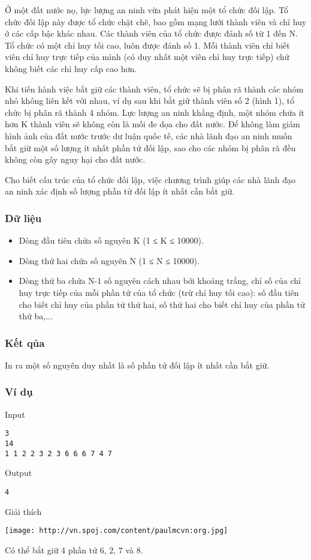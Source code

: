 

Ở một đất nước nọ, lực lượng an ninh vừa phát hiện một tổ chức đối lập. Tổ chức đối lập này được tổ chức chặt chẽ, bao gồm mạng lưới thành viên và chỉ huy ở các cấp bậc khác nhau. Các thành viên của tổ chức được đánh số từ 1 đến N. Tổ chức có một chỉ huy tối cao, luôn được đánh số 1. Mỗi thành viên chỉ biết viên chỉ huy trực tiếp của mình (có duy nhất một viên chỉ huy trực tiếp) chứ không biết các chỉ huy cấp cao hơn.

Khi tiến hành việc bắt giữ các thành viên, tổ chức sẽ bị phân rã thành các nhóm nhỏ không liên kết với nhau, ví dụ sau khi bắt giữ thành viên số 2 (hình 1), tổ chức bị phân rã thành 4 nhóm. Lực lượng an ninh khẳng định, một nhóm chứa ít hơn K thành viên sẽ không còn là mối đe dọa cho đất nước. Để không làm giảm hình ảnh của đất nước trước dư luận quốc tế, các nhà lãnh đạo an ninh muốn bắt giữ một số lượng ít nhất phần tử đối lập, sao cho các nhóm bị phân rã đều không còn gây nguy hại cho đất nước.

Cho biết cấu trúc của tổ chức đối lập, việc chương trình giúp các nhà lãnh đạo an ninh xác định số lượng phần tử đối lập ít nhất cần bắt giữ.

\subsubsection{Dữ liệu}
\begin{itemize}
	\item Dòng đầu tiên chứa số nguyên K (1 ≤ K ≤ 10000).
	\item Dòng thứ hai chứa số nguyên N (1 ≤ N ≤ 10000).
	\item Dòng thứ ba chứa N-1 số nguyên cách nhau bởi khoảng trắng, chỉ số của chỉ huy trực tiếp của mỗi phần tử của tổ chức (trừ chỉ huy tối cao): số đầu tiên cho biết chỉ huy của phần tử thứ hai, số thứ hai cho biết chỉ huy của phần tử thứ ba,...
\end{itemize}

\subsubsection{Kết qủa}

In ra một số nguyên duy nhất là số phần tử đối lập ít nhất cần bắt giữ.

\subsubsection{Ví dụ}

Input
\begin{verbatim}
3
14
1 1 2 2 3 2 3 6 6 6 7 4 7\end{verbatim}

Output
\begin{verbatim}
4\end{verbatim}

Giải thích


\texttt{[image: http://vn.spoj.com/content/paulmcvn:org.jpg]}

Có thể bắt giữ 4 phần tử 6, 2, 7 và 8.